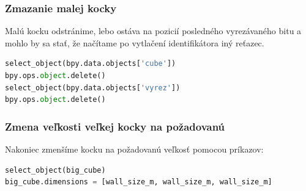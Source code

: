 \subsubsection{Zmazanie malej kocky}
Malú kocku odstránime, lebo ostáva na pozicií posledného vyrezávaného bitu a mohlo by sa stať, že načítame po vytlačení identifikátora iný reťazec.
\begin{lstlisting}[language=Python]
select_object(bpy.data.objects['cube'])
bpy.ops.object.delete()
select_object(bpy.data.objects['vyrez'])
bpy.ops.object.delete()
\end{lstlisting}

\subsubsection{Zmena veľkosti veľkej kocky na požadovanú}
Nakoniec zmenšíme kocku na požadovanú veľkosť pomocou príkazov:
\begin{lstlisting}[language=Python]
select_object(big_cube)
big_cube.dimensions = [wall_size_m, wall_size_m, wall_size_m]
\end{lstlisting}
